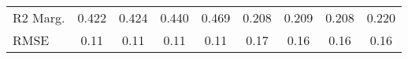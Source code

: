 \begin{tabular}{lcccc|cccc}
R2 Marg.                                     & \num{0.422}                              & \num{0.424}                              & \num{0.440}                              & \num{0.469}                              & \num{0.208}                              & \num{0.209}                              & \num{0.208}                              & \num{0.220}                              \\
RMSE                                         & \num{0.11}                               & \num{0.11}                               & \num{0.11}                               & \num{0.11}                               & \num{0.17}                               & \num{0.16}                               & \num{0.16}                               & \num{0.16}                               \\
\bottomrule
\end{tabular}

